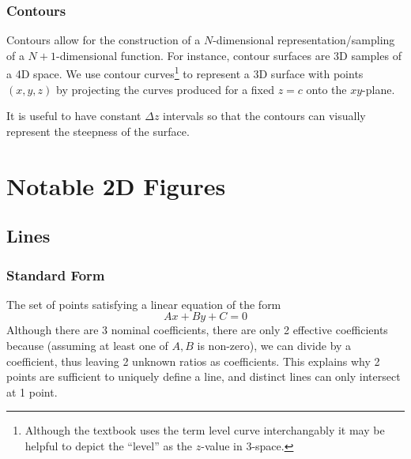 \documentclass{article}
\begin{document}
\subsubsection{Contours}
Contours allow for the construction of a $N$-dimensional representation/sampling of a $N+1$-dimensional function. For instance, contour surfaces are 3D samples of a 4D space.
We use contour curves\footnote{Although the textbook uses the term level curve interchangably it may be helpful to depict the ``level'' as the $z$-value in 3-space.} to represent a 3D surface with points $(x,y,z)$ by projecting the curves produced for a fixed $z=c$ onto the $xy$-plane.
\iffalse
Below is a (low resolution) contour plot of the top half of a sphere:
\begin{center}
\begin{tikzpicture}
\begin{axis}
[
    title={Contour plot of $x^2 + y^2 + z^2 = 1$},
    view={0}{90}
]
\addplot3[
    contour gnuplot={levels={1, 0.8, 0.6, 0.4, 0.2, 0}}
]
{sqrt(x^2+y^2)};
\end{axis}
\end{tikzpicture}
\end{center}
\fi
It is useful to have constant $\Delta z$ intervals so that the contours can visually represent the steepness of the surface.

\section{Notable 2D Figures}

\subsection{Lines}

\subsubsection{Standard Form} The set of points satisfying a linear equation of the form $$Ax + By + C = 0$$
Although there are 3 nominal coefficients, there are only 2 effective coefficients because (assuming at least one of $A,B$ is non-zero), we can divide by a coefficient, thus leaving 2 unknown ratios as coefficients. This explains why 2 points are sufficient to uniquely define a line, and distinct lines can only intersect at 1 point.
\end{document}
